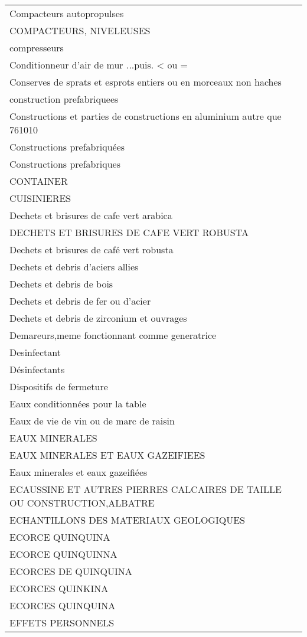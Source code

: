 \documentclass[
]{book}
\begin{document}
\begin{longtable}[t]{l}
Compacteurs autopropulses\\
COMPACTEURS, NIVELEUSES\\
\addlinespace
compresseurs\\
Conditionneur d'air de mur ...puis. < ou =\\
Conserves de sprats et esprots entiers ou en morceaux non haches\\
construction prefabriquees\\
Constructions et parties de constructions en aluminium autre que 761010\\
\addlinespace
Constructions prefabriquées\\
Constructions prefabriques\\
CONTAINER\\
CUISINIERES\\
Dechets et brisures de cafe vert arabica\\
\addlinespace
DECHETS ET BRISURES DE CAFE VERT ROBUSTA\\
Dechets et brisures de café vert robusta\\
Dechets et debris d'aciers allies\\
Dechets et debris de bois\\
Dechets et debris de fer ou d'acier\\
\addlinespace
Dechets et debris de zirconium et ouvrages\\
Demareurs,meme fonctionnant comme generatrice\\
Desinfectant\\
Désinfectants\\
Dispositifs de fermeture\\
\addlinespace
Eaux conditionnées pour la table\\
Eaux de vie de vin ou de marc de raisin\\
EAUX MINERALES\\
EAUX MINERALES ET EAUX GAZEIFIEES\\
Eaux minerales et eaux gazeifiées\\
\addlinespace
ECAUSSINE ET AUTRES PIERRES CALCAIRES DE TAILLE OU CONSTRUCTION,ALBATRE\\
ECHANTILLONS DES MATERIAUX GEOLOGIQUES\\
ECORCE QUINQUINA\\
ECORCE QUINQUINNA\\
ECORCES DE QUINQUINA\\
\addlinespace
ECORCES QUINKINA\\
ECORCES QUINQUINA\\
EFFETS PERSONNELS\\

\end{longtable}
\end{document}
